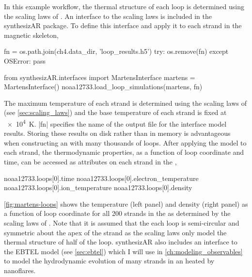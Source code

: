 In this example workflow, the thermal structure of each loop is determined using the scaling laws of \citet[see \autoref{sec:scaling_laws}]{martens_scaling_2010}. An interface to the \citeauthor{martens_scaling_2010} scaling laws is included in the synthesizAR package. To define this interface and apply it to each strand in the magnetic skeleton,
\begin{pycode}[chapter4]
fn = os.path.join(ch4.data_dir, 'loop_results.h5')
try:
    os.remove(fn)
except OSError:
    pass
\end{pycode}
\begin{pyblock}[chapter4][baselinestretch=1,xleftmargin=3em]
from synthesizAR.interfaces import MartensInterface
martens = MartensInterface()
noaa12733.load_loop_simulations(martens, fn)
\end{pyblock}
The maximum temperature of each strand is determined using the scaling laws of \citet{rosner_dynamics_1978} (see \autoref{sec:scaling_laws}) and the base temperature of each strand is fixed at \SI{e4}{\kelvin}. \pyv|fn| specifies the name of the output file for the interface model results. Storing these results on disk rather than in memory is advantageous when constructing an \AR{} with many thousands of loops. After applying the model to each strand, the thermodynamic properties, as a function of loop coordinate and time, can be accessed as attributes on each strand in the \AR{},
\begin{pyblock}[chapter4][baselinestretch=1,xleftmargin=3em]
noaa12733.loops[0].time
noaa12733.loops[0].electron_temperature
noaa12733.loops[0].ion_temperature
noaa12733.loops[0].density
\end{pyblock}
\autoref{fig:martens-loops} shows the temperature (left panel) and density (right panel) as a function of loop coordinate for all 200 strands in the \AR{} as determined by the scaling laws of \citet{martens_scaling_2010}. Note that it is assumed that the each loop is semi-circular and symmetric about the apex of the strand as the \citeauthor{martens_scaling_2010} scaling laws only model the thermal structure of half of the loop. synthesizAR also includes an interface to the EBTEL model (see \autoref{sec:ebtel}) which I will use in \autoref{ch:modeling_observables} to model the hydrodynamic evolution of many strands in an \AR{} heated by nanoflares.

